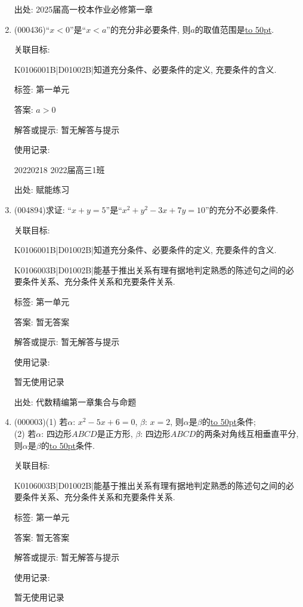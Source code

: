 \documentclass[10pt,a4paper]{article}
\newcommand{\blank}[1]{\underline{\hbox to #1pt{}}}
\begin{document}
\begin{enumerate}[1.]
出处: 2025届高一校本作业必修第一章
\item { (000436)}``$x<0$''是``$x<a$''的充分非必要条件, 则$a$的取值范围是\blank{50}.


关联目标:

K0106001B|D01002B|知道充分条件、必要条件的定义, 充要条件的含义.



标签: 第一单元

答案: $a>0$

解答或提示: 暂无解答与提示

使用记录:

20220218	2022届高三1班	


出处: 赋能练习
\item { (004894)}求证: ``$x+y=5$''是``$x^2+y^2-3x+7y=10$''的充分不必要条件.


关联目标:

K0106001B|D01002B|知道充分条件、必要条件的定义, 充要条件的含义.

K0106003B|D01002B|能基于推出关系有理有据地判定熟悉的陈述句之间的必要条件关系、充分条件关系和充要条件关系.



标签: 第一单元

答案: 暂无答案

解答或提示: 暂无解答与提示

使用记录:

暂无使用记录


出处: 代数精编第一章集合与命题
\item { (000003)}(1) 若$\alpha$: $x^2-5x+6=0$, $\beta$: $x=2$, 则$\alpha$是$\beta$的\blank{50}条件;\\
(2) 若$\alpha$: 四边形$ABCD$是正方形, $\beta$: 四边形$ABCD$的两条对角线互相垂直平分, 则$\alpha$是$\beta$的\blank{50}条件.


关联目标:

K0106003B|D01002B|能基于推出关系有理有据地判定熟悉的陈述句之间的必要条件关系、充分条件关系和充要条件关系.



标签: 第一单元

答案: 暂无答案

解答或提示: 暂无解答与提示

使用记录:

暂无使用记录



\end{enumerate}
\end{document}
